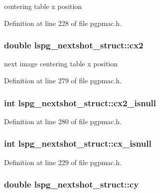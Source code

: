 centering table x position 



Definition at line 228 of file pgpmac.\-h.

\hypertarget{structlspg__nextshot__struct_a10d45763100bc59f9a5f68f1b48db6d3}{
\subsubsection[{cx2}]{\setlength{\rightskip}{0pt plus 5cm}double lspg\-\_\-nextshot\-\_\-struct\-::cx2}}\label{structlspg__nextshot__struct_a10d45763100bc59f9a5f68f1b48db6d3}


next image centering table x position 



Definition at line 279 of file pgpmac.\-h.

\hypertarget{structlspg__nextshot__struct_a3ad947f4efe2cb5c338244b019334749}{
\subsubsection[{cx2\-\_\-isnull}]{\setlength{\rightskip}{0pt plus 5cm}int lspg\-\_\-nextshot\-\_\-struct\-::cx2\-\_\-isnull}}\label{structlspg__nextshot__struct_a3ad947f4efe2cb5c338244b019334749}


Definition at line 280 of file pgpmac.\-h.

\hypertarget{structlspg__nextshot__struct_a779b99533f0ed4e659177afb0b791ad2}{
\subsubsection[{cx\-\_\-isnull}]{\setlength{\rightskip}{0pt plus 5cm}int lspg\-\_\-nextshot\-\_\-struct\-::cx\-\_\-isnull}}\label{structlspg__nextshot__struct_a779b99533f0ed4e659177afb0b791ad2}


Definition at line 229 of file pgpmac.\-h.

\hypertarget{structlspg__nextshot__struct_ab7a7b37a17f06c4e9ebdcdf056946098}{
\subsubsection[{cy}]{\setlength{\rightskip}{0pt plus 5cm}double lspg\-\_\-nextshot\-\_\-struct\-::cy}}\label{structlspg__nextshot__struct_ab7a7b37a17f06c4e9ebdcdf056946098}


